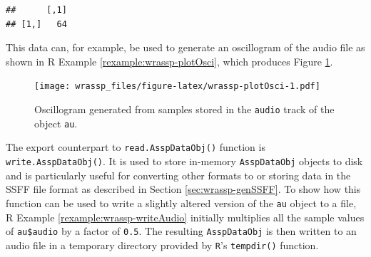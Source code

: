 \documentclass[]{book}
\newenvironment{Shaded}{\begin{snugshade}}{\end{snugshade}}
\newcommand{\CommentTok}[1]{\textcolor[rgb]{0.56,0.35,0.01}{\textit{#1}}}
\newcommand{\DataTypeTok}[1]{\textcolor[rgb]{0.13,0.29,0.53}{#1}}
\newcommand{\DecValTok}[1]{\textcolor[rgb]{0.00,0.00,0.81}{#1}}
\newcommand{\KeywordTok}[1]{\textcolor[rgb]{0.13,0.29,0.53}{\textbf{#1}}}
\newcommand{\NormalTok}[1]{#1}
\newcommand{\OperatorTok}[1]{\textcolor[rgb]{0.81,0.36,0.00}{\textbf{#1}}}
\newcommand{\StringTok}[1]{\textcolor[rgb]{0.31,0.60,0.02}{#1}}
\theoremstyle{definition}
\theoremstyle{definition}
\theoremstyle{definition}
\theoremstyle{remark}
\begin{document}
\begin{Shaded}
\end{Shaded}

\begin{verbatim}
##      [,1]
## [1,]   64
\end{verbatim}

This data can, for example, be used to generate an oscillogram of the
audio file as shown in R Example \ref{rexample:wrassp-plotOsci}, which
produces Figure \ref{fig:wrassp-plotOsci}.

\begin{Shaded}
\end{Shaded}

\begin{figure}
\centering
\texttt{[image: wrassp\_files/figure-latex/wrassp-plotOsci-1.pdf]}
\caption{\label{fig:wrassp-plotOsci}Oscillogram generated from samples
stored in the \texttt{audio} track of the object \texttt{au}.}
\end{figure}

The export counterpart to \texttt{read.AsspDataObj()} function is
\texttt{write.AsspDataObj()}. It is used to store in-memory
\texttt{AsspDataObj} objects to disk and is particularly useful for
converting other formats to or storing data in the SSFF file format as
described in Section \ref{sec:wrassp-genSSFF}. To show how this function
can be used to write a slightly altered version of the \texttt{au}
object to a file, R Example \ref{rexample:wrassp-writeAudio} initially
multiplies all the sample values of \texttt{au\$audio} by a factor of
\texttt{0.5}. The resulting \texttt{AsspDataObj} is then written to an
audio file in a temporary directory provided by \texttt{R}'s
\texttt{tempdir()} function.
\end{document}

